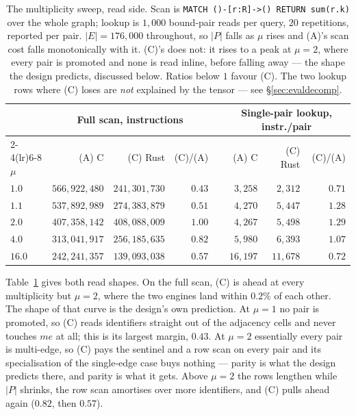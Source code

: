 \documentclass[11pt,a4paper]{article}
\theoremstyle{plain}
\theoremstyle{definition}
\theoremstyle{remark}
\begin{document}
\begin{table}[!ht]
\centering
\small
\begin{tabular}{@{}lrrrcrrr@{}}
\toprule
 & \multicolumn{3}{c}{Full scan, instructions} & & \multicolumn{3}{c}{Single-pair lookup, instr./pair} \\
\cmidrule(lr){2-4}\cmidrule(lr){6-8}
$\mu$ & (A) C & (C) Rust & (C)/(A) & & (A) C & (C) Rust & (C)/(A) \\
\midrule
$1.0$  & $566{,}922{,}480$ & $241{,}301{,}730$ & $0.43$ & & $3{,}258$  & $2{,}312$  & $0.71$ \\
$1.1$  & $537{,}892{,}989$ & $274{,}383{,}879$ & $0.51$ & & $4{,}270$  & $5{,}447$  & $1.28$ \\
$2.0$  & $407{,}358{,}142$ & $408{,}088{,}009$ & $1.00$ & & $4{,}267$  & $5{,}498$  & $1.29$ \\
$4.0$  & $313{,}041{,}917$ & $256{,}185{,}635$ & $0.82$ & & $5{,}980$  & $6{,}393$  & $1.07$ \\
$16.0$ & $242{,}241{,}357$ & $139{,}093{,}038$ & $0.57$ & & $16{,}197$ & $11{,}678$ & $0.72$ \\
\bottomrule
\end{tabular}
\caption{The multiplicity sweep, read side. Scan is
\texttt{MATCH ()-[r:R]->() RETURN sum(r.k)} over the whole graph; lookup is
$1{,}000$ bound-pair reads per query, $20$ repetitions, reported per pair.
$|E| = 176{,}000$ throughout, so $|P|$ falls as $\mu$ rises and (A)'s scan cost
falls monotonically with it. (C)'s does not: it rises to a peak at $\mu = 2$,
where every pair is promoted and none is read inline, before falling away ---
the shape the design predicts, discussed below. Ratios below $1$ favour (C).
The two lookup rows where (C) loses are \emph{not} explained by the tensor ---
see \S\ref{sec:evaldecomp}.}
\label{tab:evalread}
\end{table}

Table~\ref{tab:evalread} gives both read shapes. On the full scan, (C) is ahead
at every multiplicity but $\mu = 2$, where the two engines land within $0.2\%$
of each other. The shape of that curve is the design's own prediction. At
$\mu = 1$ no pair is promoted, so (C) reads identifiers straight out of the
adjacency cells and never touches $me$ at all; this is its largest margin,
$0.43$. At $\mu = 2$ essentially every pair is multi-edge, so (C) pays the
sentinel and a row scan on every pair and its specialisation of the
single-edge case buys nothing --- parity is what the design predicts there,
and parity is what it gets. Above $\mu = 2$ the rows lengthen while $|P|$
shrinks, the row scan amortises over more identifiers, and (C) pulls ahead
again ($0.82$, then $0.57$).
\end{document}
